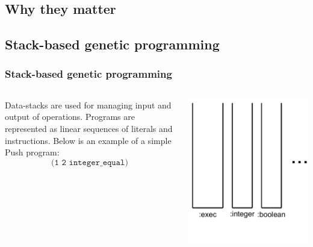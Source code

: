 \documentclass{beamer}
\newcommand{\linespace}{\vskip 0.25cm}
\begin{document}
\subsection{Why they matter}
\subsection{Stack-based genetic programming}

\begin{frame}
	\frametitle{Stack-based genetic programming}
	\begin{columns}
		\begin{column}{0.6\textwidth}
			Data-stacks are used for managing input and output of operations.
			\linespace
			\linespace
			\linespace
			Programs are represented as linear sequences of literals and instructions. Below is an example of a simple Push program:
			\[\texttt{(1 2 integer\_equal)}\]
		\end{column}
	\begin{column}{0.4\textwidth}
		\includegraphics[height=1.2\textwidth]{Illustrations/empty_stacks.PDF}
	\end{column}
	\end{columns}
\end{frame}
\end{document}
